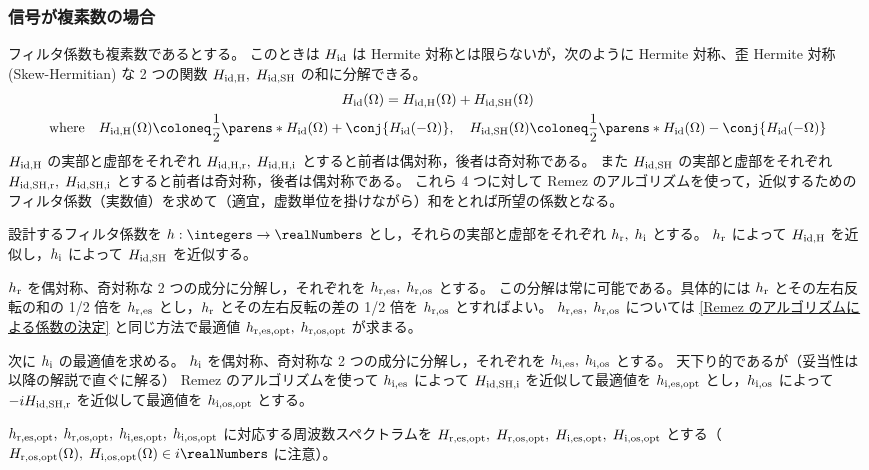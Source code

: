         \subsubsection{信号が複素数の場合}
            フィルタ係数も複素数であるとする。
            このときは $H_{\text{id}}$ は Hermite 対称とは限らないが，次のように Hermite 対称、歪 Hermite 対称 (Skew-Hermitian) な 2 つの関数 $H_{\text{id,H}},\;H_{\text{id,SH}}$ の和に分解できる。
            \begin{gather*}
                \Hid(\Omega) = \HidH(\Omega) + \HidSH(\Omega) \\
                \text{where}\quad\HidH(\Omega)\coloneq\frac{1}{2}\parens*{\Hid(\Omega) + \conj{\Hid(-\Omega)}},\quad\HidSH(\Omega)\coloneq\frac{1}{2}\parens*{\Hid(\Omega) - \conj{\Hid(-\Omega)}}
            \end{gather*}
            $H_{\text{id,H}}$ の実部と虚部をそれぞれ $H_{\text{id,H,r}},\;H_{\text{id,H,i}}$ とすると前者は偶対称，後者は奇対称である。
            また $H_{\text{id,SH}}$ の実部と虚部をそれぞれ $H_{\text{id,SH,r}},\;H_{\text{id,SH,i}}$ とすると前者は奇対称，後者は偶対称である。
            これら 4 つに対して Remez のアルゴリズムを使って，近似するためのフィルタ係数（実数値）を求めて（適宜，虚数単位を掛けながら）和をとれば所望の係数となる。
            \par
            設計するフィルタ係数を $h:\integers\to\realNumbers$ とし，それらの実部と虚部をそれぞれ $h_{\text{r}},\;h_{\text{i}}$ とする。
            $h_{\text{r}}$ によって $H_{\text{id,H}}$ を近似し，$h_{\text{i}}$ によって $H_{\text{id,SH}}$ を近似する。
            \par
            $h_{\text{r}}$ を偶対称、奇対称な 2 つの成分に分解し，それぞれを $h_{\text{r,es}},\;h_{\text{r,os}}$ とする。
            この分解は常に可能である。具体的には $h_{\text{r}}$ とその左右反転の和の 1/2 倍を $h_{\text{r,es}}$ とし，$h_{\text{r}}$ とその左右反転の差の 1/2 倍を $h_{\text{r,os}}$ とすればよい。
            $h_{\text{r,es}},\;h_{\text{r,os}}$ については \ref{Remez のアルゴリズムによる係数の決定} と同じ方法で最適値 $h_{\text{r,es,opt}},\;h_{\text{r,os,opt}}$ が求まる。
            \par
            次に $h_{\text{i}}$ の最適値を求める。
            $h_{\text{i}}$ を偶対称、奇対称な 2 つの成分に分解し，それぞれを $h_{\text{i,es}},\;h_{\text{i,os}}$ とする。
            天下り的であるが（妥当性は以降の解説で直ぐに解る） Remez のアルゴリズムを使って $h_{\text{i,es}}$ によって $H_{\text{id,SH,i}}$ を近似して最適値を $h_{\text{i,es,opt}}$ とし，$h_{\text{i,os}}$ によって $-iH_{\text{id,SH,r}}$ を近似して最適値を $h_{\text{i,os,opt}}$ とする。
            \par
            $h_{\text{r,es,opt}},\;h_{\text{r,os,opt}},\;h_{\text{i,es,opt}},\;h_{\text{i,os,opt}}$ に対応する周波数スペクトラムを $H_{\text{r,es,opt}},\;H_{\text{r,os,opt}},\;H_{\text{i,es,opt}},\;H_{\text{i,os,opt}}$ とする（$\HrOsOpt(\Omega),\;\HiOsOpt(\Omega)\in i\realNumbers$ に注意）。
